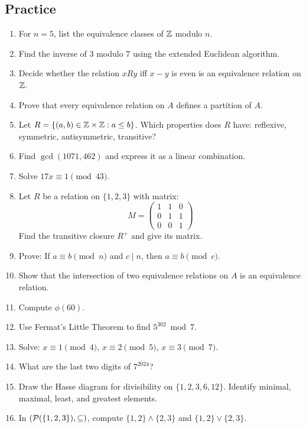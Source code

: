 \subsection*{Practice}
\begin{enumerate}
  \item For $n = 5$, list the equivalence classes of $\mathbb{Z}$ modulo $n$.

  \item Find the inverse of $3$ modulo $7$ using the extended Euclidean algorithm.

  \item Decide whether the relation $xRy$ iff $x - y$ is even is an equivalence relation on $\mathbb{Z}$.

  \item Prove that every equivalence relation on $A$ defines a partition of $A$.

  \item Let $R = \{(a,b) \in \mathbb{Z} \times \mathbb{Z} : a \leq b\}$. Which properties does $R$ have: reflexive, symmetric, antisymmetric, transitive?

  \item Find $\gcd(1071, 462)$ and express it as a linear combination.

  \item Solve $17x \equiv 1 \pmod{43}$.

  \item Let $R$ be a relation on $\{1,2,3\}$ with matrix:
  \[
  M = \begin{pmatrix} 1 & 1 & 0 \\ 0 & 1 & 1 \\ 0 & 0 & 1 \end{pmatrix}
  \]
  Find the transitive closure $R^+$ and give its matrix.

  \item Prove: If $a \equiv b \pmod{n}$ and $c \mid n$, then $a \equiv b \pmod{c}$.

  \item Show that the intersection of two equivalence relations on $A$ is an equivalence relation.

  \item Compute $\phi(60)$.

  \item Use Fermat's Little Theorem to find $5^{302} \bmod 7$.

  \item Solve: $x \equiv 1 \pmod{4}$, $x \equiv 2 \pmod{5}$, $x \equiv 3 \pmod{7}$.

  \item What are the last two digits of $7^{2024}$?

  \item Draw the Hasse diagram for divisibility on $\{1,2,3,6,12\}$. Identify minimal, maximal, least, and greatest elements.

  \item In $(\mathcal{P}(\{1,2,3\}), \subseteq)$, compute $\{1,2\} \wedge \{2,3\}$ and $\{1,2\} \vee \{2,3\}$.
\end{enumerate}
